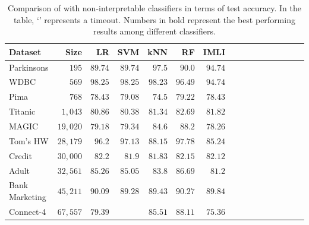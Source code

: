 \begin{table}[!t]        
	\centering
	\caption[Accuracy of {\imli} and non-interpretable classifiers]{Comparison of {\imli} with non-interpretable classifiers in terms of test accuracy. In the table, `\textemdash' represents a timeout. Numbers in bold represent the best performing results among different classifiers.}
	\label{interpretability_imli_table:non_interpretable_classifiers}
	\small
	\begin{tabular}{lrrrrrrrrrrrrrrr}
		
		
		
		
		\toprule
		Dataset & Size & LR & SVM & kNN & RF & IMLI \\
		
		\midrule
		\multirow{1}{*}{Parkinsons} & \multirow{1}{*}{ $ 195 $ }  &
		$ 89.74 $  &  $ 89.74 $  &  $ \mathbf{97.5} $  &  $ 90.0 $  &  $ 94.74 $  \\
		\multirow{1}{*}{WDBC} & \multirow{1}{*}{ $ 569 $ }  &
		$ \mathbf{98.25} $  &  $ \mathbf{98.25} $  &  $ 98.23 $  &  $ 96.49 $  &  $ 94.74 $  \\
		\multirow{1}{*}{Pima} & \multirow{1}{*}{ $ 768 $ }  &
		$ 78.43 $  &  $ 79.08 $  &  $ 74.5 $  &  $ \mathbf{79.22} $  &  $ 78.43 $  \\
		\multirow{1}{*}{Titanic} & \multirow{1}{*}{ $ 1,043 $ }  &
		$ 80.86 $  &  $ 80.38 $  &  $ 81.34 $  &  $ \mathbf{82.69} $  &  $ 81.82 $  \\
		\multirow{1}{*}{MAGIC} & \multirow{1}{*}{ $ 19,020 $ }  &
		$ 79.18 $  &  $ 79.34 $  &  $ 84.6 $  &  $ \mathbf{88.2} $  &  $ 78.26 $  \\
		\multirow{1}{*}{Tom's HW} & \multirow{1}{*}{ $ 28,179 $ }  &
		$ 96.2 $  &  $ 97.13 $  &  $ 88.15 $  &  $ \mathbf{97.78} $  &  $ 85.24 $  \\
		\multirow{1}{*}{Credit} & \multirow{1}{*}{ $ 30,000 $ }  &
		$ \mathbf{82.2} $  &  $ 81.9 $  &  $ 81.83 $  &  $ 82.15 $  &  $ 82.12 $  \\
		\multirow{1}{*}{Adult} & \multirow{1}{*}{ $ 32,561 $ }  &
		$ 85.26 $  &  $ 85.05 $  &  $ 83.8 $  &  $ \mathbf{86.69} $  &  $ 81.2 $  \\
		\multirow{1}{*}{Bank Marketing} & \multirow{1}{*}{ $ 45,211 $ }  &
		$ 90.09 $  &  $ 89.28 $  &  $ 89.43 $  &  $ \mathbf{90.27} $  &  $ 89.84 $  \\
		\multirow{1}{*}{Connect-4} & \multirow{1}{*}{ $ 67,557 $ }  &
		$ 79.39 $  & \textemdash &  $ 85.51 $  &  $ \mathbf{88.11} $  &  $ 75.36 $  \\

\end{tabular}
\end{table}
